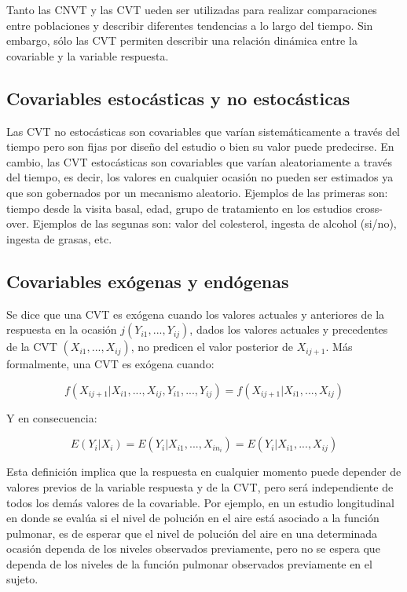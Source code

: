 \documentclass[spanish]{article}
\numberwithin{figure}{subsection}
\numberwithin{equation}{subsection}
\numberwithin{table}{subsection}
\begin{document}
Tanto las CNVT y las CVT ueden ser utilizadas para realizar comparaciones entre
poblaciones y describir diferentes tendencias a lo largo del tiempo. Sin
embargo, sólo las CVT permiten describir una relación dinámica entre la
covariable y la variable respuesta.

\subsection{Covariables estocásticas y no estocásticas}

Las CVT no estocásticas son covariables que varían sistemáticamente a través
del tiempo pero son fijas por diseño del estudio o bien su valor puede
predecirse. En cambio, las CVT estocásticas son covariables que varían
aleatoriamente a través del tiempo, es decir, los valores en cualquier ocasión
no pueden ser estimados ya que son gobernados por un mecanismo aleatorio.
Ejemplos de las primeras son: tiempo desde la visita basal, edad, grupo de
tratamiento en los estudios cross-over. Ejemplos de las segunas son: valor del
colesterol, ingesta de alcohol (si/no), ingesta de grasas, etc.

\subsection{Covariables exógenas y endógenas}

Se dice que una CVT es exógena cuando los valores actuales y anteriores de la
respuesta en la ocasión $j (Y_{i1}, ..., Y_{ij})$, dados los valores actuales y
precedentes de la CVT $(X_{i1}, ..., X_{ij})$, no predicen el valor posterior
de $X_{ij+1}$. Más formalmente, una CVT es exógena cuando:

\begin{equation}
	\label{exogeneidad}
	f(X_{ij+1}|X_{i1}, ..., X_{ij}, Y_{i1}, ..., Y_{ij}) =
	f(X_{ij+1}|X_{i1}, ..., X_{ij})
\end{equation}

Y en consecuencia:

\begin{equation}
	\label{exogeneidad debil}
	E(Y_i|X_i) = E(Y_i|X_{i1}, ..., X_{in_i}) = E(Y_i|X_{i1}, ..., X_{ij})
\end{equation}

Esta definición implica que la respuesta en cualquier momento puede depender de
valores previos de la variable respuesta y de la CVT, pero será independiente
de todos los demás valores de la covariable. Por ejemplo, en un estudio
longitudinal en donde se evalúa si el nivel de polución en el aire está
asociado a la función pulmonar, es de esperar que el nivel de polución del aire
en una determinada ocasión dependa de los niveles observados previamente, pero
no se espera que dependa de los niveles de la función pulmonar observados
previamente en el sujeto.
\end{document}
